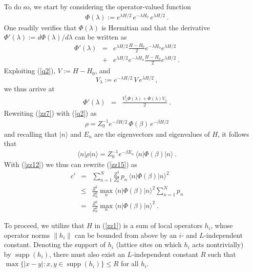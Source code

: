 \documentclass[twocolumn,aps,prb,floatfix,superscriptaddress]{revtex4-2}
\newcommand{\<}{\left\langle}	%
\renewcommand{\>}{\right\rangle}	%
\providecommand{\norm}[1]{\|#1\|}
\begin{document}
To do so, we
start by considering the operator-valued function 
\begin{eqnarray}
\Phi(\lambda) :=  e^{\lambda H/2} \, e^{-\lambda H_0} \, e^{\lambda H / 2}
\ .
\label{q2}
\end{eqnarray}
One readily verifies that $\Phi(\lambda)$ is Hermitian and that
the derivative $\Phi'(\lambda):=d\Phi(\lambda)/d\lambda$ can be written as
\begin{eqnarray}
\Phi'(\lambda)
& = & 
e^{\lambda H/2} \frac{H-H_0}{2} e^{-\lambda H_0}  e^{\lambda H / 2}
\nonumber
\\
& + &
e^{\lambda H/2}e^{-\lambda H_0}  \frac{H-H_0}{2}  e^{\lambda H / 2}
\ .
\label{q3}
\end{eqnarray}
Exploiting (\ref{q2}), $V:=H-H_0$, and 
\begin{equation}
	V_\lambda := e^{-\lambda H/2} \, V \, e^{\lambda H / 2} \,,
	\label{q4}
\end{equation}
we thus arrive at
\begin{eqnarray}
\Phi'(\lambda)
& = & \frac{V_\lambda^\dagger \Phi(\lambda) + \Phi(\lambda) V_\lambda}{2}
\ .
\label{q5}
\end{eqnarray}
% 
Rewriting (\ref{zz7}) with (\ref{q2}) as 
\begin{eqnarray}
\rho = Z_0^{-1}  e^{-\beta H/2} \, \Phi(\beta) \, e^{-\beta H / 2}
\label{q9}
\end{eqnarray}
and recalling that $|n\rangle$ and $E_n$ are the eigenvectors and
eigenvalues of $H$, it follows that 
\begin{eqnarray}
\langle n|\rho |n \rangle = Z_0^{-1}  e^{-\beta E_n} \, \langle n| \Phi(\beta) | n \rangle 
\ .
\label{q10}
\end{eqnarray}
With (\ref{zz12}) we thus can rewrite (\ref{zz15}) as
\begin{eqnarray} 
c' & = & \sum_{n=1}^N \frac{Z^2}{Z_0^2} \,  p_n  \, \langle n| \Phi(\beta) | n \rangle^2
\nonumber
\\
& \leq & \frac{Z^2}{Z_0^2}  \max_n \langle n| \Phi(\beta) | n \rangle^2  \sum_{n=1}^N  p_n
\nonumber
\\
& = &  \frac{Z^2}{Z_0^2}  \max_n \langle n| \Phi(\beta) | n \rangle^2
\ .
\label{q11}
\end{eqnarray}

To proceed, we utilize that $H$ in (\ref{zz1})
is a sum of local operators $h_i$,
whose operator norms 
$\norm{h_i}$ can be bounded from above 
by an $i$- and $L$-independent constant.
Denoting the support of $h_i$ (lattice sites on which $h_i$ acts nontrivially) 
by $\operatorname{supp}(h_i)$, there must also exist an $L$-independent 
constant $R$ such that 
$\max \{ \lvert x - y \rvert : x, y \in \operatorname{supp}(h_i)\} \leq R$ 
for all $h_i$.
\end{document}
